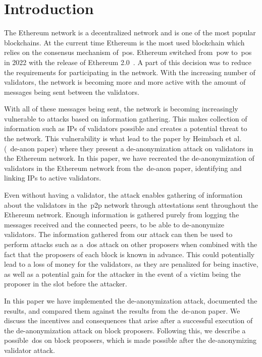 

\section{Introduction}\label{sec:introduction}
The Ethereum network is a decentralized network and is one of the most popular blockchains.
At the current time Ethereum is the most used blockchain which relies on the consensus mechanism of~\gls{pos}.
Ethereum switched from~\gls{pow} to~\gls{pos} in 2022 with the release of Ethereum 2.0~\cite{EthereumProof-of-stakePoS}.
A part of this decision was to reduce the requirements for participating in the network.
With the increasing number of validators, the network is becoming more and more active with the amount of messages being sent between the validators.


With all of these messages being sent, the network is becoming increasingly vulnerable to attacks based on information gathering.
This makes collection of information such as IPs of validators possible and creates a potential threat to the network.
This vulnerability is what lead to the paper by Heimbach et al.~\cite{heimbach2024deanonymizingethereumvalidatorsp2p} (~\gls{de-anon paper}) where they present a de-anonymization attack on validators in the Ethereum network.
In this paper, we have recreated the de-anonymization of validators in the Ethereum network from the~\gls{de-anon paper}, identifying and linking IPs to active validators.


Even without having a validator, the attack enables gathering of information about the validators in the~\gls{p2p} network through attestations sent throughout the Ethereum network.
Enough information is gathered purely from logging the messages received and the connected peers, to be able to de-anonymize validators.
The information gathered from our attack can then be used to perform attacks such as a~\gls{dos} attack on other proposers when combined with the fact that the proposers of each block is known in advance.
This could potentially lead to a loss of money for the validators, as they are penalized for being inactive, as well as a potential gain for the attacker in the event of a victim being the proposer in the slot before the attacker.

In this paper we have implemented the de-anonymization attack, documented the results, and compared them against
the results from the~\gls{de-anon paper}.
We discuss the incentives and consequences that arise after a successful execution of the de-anonymization attack on block proposers.
Following this, we describe a possible~\gls{dos} on block proposers, which is made possible after the de-anonymizing validator attack.


